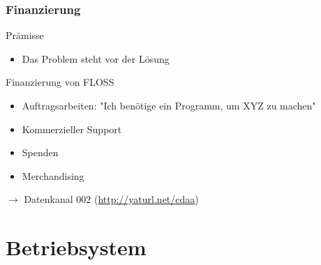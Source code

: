 \documentclass[compress]{beamer}
\begin{document}
\begin{frame}
	\frametitle{Finanzierung}
	\begin{block}{Prämisse}
		\begin{itemize}
			\item Das Problem steht vor der Lösung
		\end{itemize}
	\end{block}
	\pause
	\begin{block}{Finanzierung von FLOSS}
		\begin{itemize}
			\item Auftragsarbeiten: "Ich benötige ein Programm, um XYZ 
				zu machen"
			\item Kommerzieller Support
			\item Spenden
			\item Merchandising 
		\end{itemize}
	\end{block}
	\pause
	$\rightarrow$ Datenkanal 002 (\url{http://yaturl.net/cdaa})
\end{frame}

\section{Betriebsystem}
\end{document}
